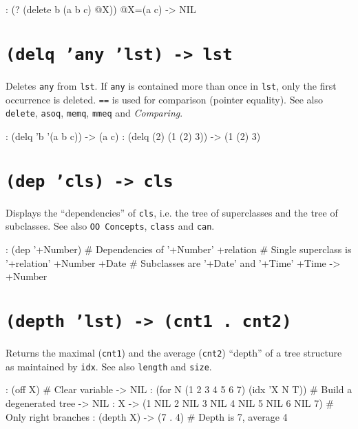 {\begin{wideverbatim}
: (? (delete b (a b c) @X))
 @X=(a c)
-> NIL
\end{wideverbatim}

 
\section*{\texttt{(delq 'any 'lst) -> lst}}
\label{sec:func-ref-D-(delq 'any 'lst) -> lst}


Deletes \texttt{any} from \texttt{lst}. If \texttt{any} is contained more than once in \texttt{lst},
only the first occurrence is deleted. \texttt{==} is used for comparison
(pointer equality). See also \texttt{delete}, \texttt{asoq}, \texttt{memq}, \texttt{mmeq} and
\emph{Comparing}.


\begin{wideverbatim}
: (delq 'b '(a b c))
-> (a c)
: (delq (2) (1 (2) 3))
-> (1 (2) 3)
\end{wideverbatim}

 
\section*{\texttt{(dep 'cls) -> cls}}
\label{sec:func-ref-D-(dep 'cls) -> cls}


Displays the ``dependencies'' of \texttt{cls}, i.e. the tree of superclasses and
the tree of subclasses. See also \texttt{OO Concepts}, \texttt{class} and \texttt{can}.


\begin{wideverbatim}
: (dep '+Number)           # Dependencies of '+Number'
   +relation               # Single superclass is '+relation'
+Number
   +Date                   # Subclasses are '+Date' and '+Time'
   +Time
-> +Number
\end{wideverbatim}

 
\section*{\texttt{(depth 'lst) -> (cnt1 . cnt2)}}
\label{sec:func-ref-D-(depth 'lst) -> (cnt1 . cnt2)}


Returns the maximal (\texttt{cnt1}) and the average (\texttt{cnt2}) ``depth'' of a tree
structure as maintained by \texttt{idx}. See also \texttt{length} and \texttt{size}.


\begin{wideverbatim}
: (off X)                                    # Clear variable
-> NIL
: (for N (1 2 3 4 5 6 7) (idx 'X N T))       # Build a degenerated tree
-> NIL
: X
-> (1 NIL 2 NIL 3 NIL 4 NIL 5 NIL 6 NIL 7)   # Only right branches
: (depth X)
-> (7 . 4)                                   # Depth is 7, average 4
\end{wideverbatim}

}
